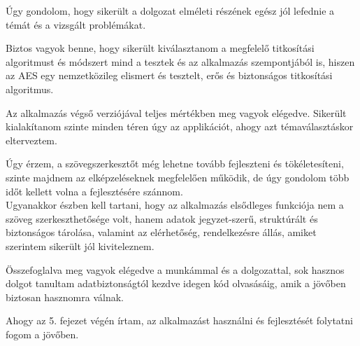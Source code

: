 
Úgy gondolom, hogy sikerült a dolgozat elméleti részének egész jól lefednie a témát és a vizsgált problémákat.

Biztos vagyok benne, hogy sikerült kiválasztanom a megfelelő titkosítási algoritmust és módszert mind a tesztek és az alkalmazás szempontjából is, hiszen az AES egy nemzetközileg elismert és tesztelt, erős és biztonságos titkosítási algoritmus.

Az alkalmazás végső verziójával teljes mértékben meg vagyok elégedve. Sikerült kialakítanom szinte minden téren úgy az applikációt, ahogy azt témaválasztáskor elterveztem.

Úgy érzem, a szövegszerkesztőt még lehetne  tovább fejleszteni és tökéletesíteni, szinte majdnem az elképzeléseknek megfelelően működik, de úgy gondolom több időt kellett volna a fejlesztésére szánnom. \\Ugyanakkor észben kell tartani, hogy az alkalmazás elsődleges funkciója nem a szöveg szerkeszthetősége volt, hanem adatok jegyzet-szerű, struktúrált és biztonságos tárolása, valamint az elérhetőség, rendelkezésre állás, amiket szerintem sikerült jól kiviteleznem.

Összefoglalva meg vagyok elégedve a munkámmal és a dolgozattal, sok hasznos dolgot tanultam adatbiztonságtól kezdve idegen kód olvasásáig, amik a jövőben biztosan hasznomra válnak.

Ahogy az 5. fejezet végén írtam, az alkalmazást használni és fejlesztését folytatni fogom a jövőben.


